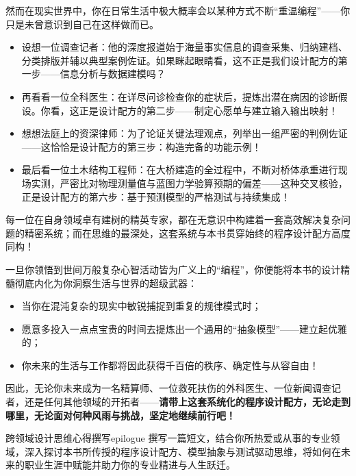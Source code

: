 然而在现实世界中，你在日常生活中极大概率会以某种方式不断“重温编程”——你只是未曾意识到自己在这样做而已。
\begin{itemize}
  \item 设想一位调查记者：他的深度报道始于海量事实信息的调查采集、归纳建档、分类排版并辅以典型案例佐证。如果眯起眼睛看，这不正是我们设计配方的第一步——信息分析与数据建模吗？
  \item 再看看一位全科医生：在详尽问诊检查你的症状后，提炼出潜在病因的诊断假设。你看，这正是设计配方的第二步——制定心愿单与建立输入输出映射！
  \item 想想法庭上的资深律师：为了论证关键法理观点，列举出一组严密的判例佐证——这恰恰是设计配方的第三步：构造完备的功能示例！
  \item 最后看一位土木结构工程师：在大桥建造的全过程中，不断对桥体承重进行现场实测，严密比对物理测量值与蓝图力学验算预期的偏差——这种交叉核验，正是设计配方的第六步：基于预测模型的严格测试与持续集成！
\end{itemize}

每一位在自身领域卓有建树的精英专家，都在无意识中构建着一套高效解决复杂问题的精密系统；而在思维的最深处，这套系统与本书贯穿始终的程序设计配方高度同构！

一旦你领悟到世间万般复杂心智活动皆为广义上的“编程”，你便能将本书的设计精髓彻底内化为你洞察生活与世界的超级武器：
\begin{itemize}
  \item 当你在混沌复杂的现实中敏锐捕捉到重复的规律模式时；
  \item 愿意多投入一点点宝贵的时间去提炼出一个通用的“抽象模型”——建立起优雅的；
  \item 你未来的生活与工作都将因此获得千百倍的秩序、确定性与从容自由！
\end{itemize}

因此，无论你未来成为一名精算师、一位救死扶伤的外科医生、一位新闻调查记者，还是任何其他领域的开拓者——\textbf{请带上这套系统化的程序设计配方，无论走到哪里，无论面对何种风雨与挑战，坚定地继续前行吧！}

\begin{exercise}{跨领域设计思维心得撰写}{epilogue}
撰写一篇短文，结合你所热爱或从事的专业领域，深入探讨本书所传授的程序设计配方、模型抽象与测试驱动思维，将如何在未来的职业生涯中赋能并助力你的专业精进与人生跃迁。
\end{exercise}
